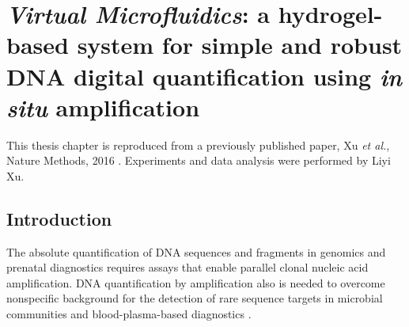 \chapter{\textbf{\textit{Virtual Microfluidics}}: a hydrogel-based system for simple and robust DNA digital quantification using \textit{in situ} amplification}
This thesis chapter is reproduced from a previously published paper, Xu \textit{et al.}, Nature Methods, 2016 \cite{Xu:2016wt}. Experiments and data analysis were performed by Liyi Xu. 


\section{Introduction}

The absolute quantification of DNA sequences and fragments in genomics \cite{Blainey:2011dt} and prenatal diagnostics \cite{Lo:2007hb} requires assays that enable parallel clonal nucleic acid amplification. DNA quantification by amplification also is needed to overcome nonspecific background for the detection of rare sequence targets in microbial communities and blood-plasma-based diagnostics \cite{Huggett:2015hp,Gevensleben:2013kg,Kuypers:2017it,Johnson:2002wb}.


